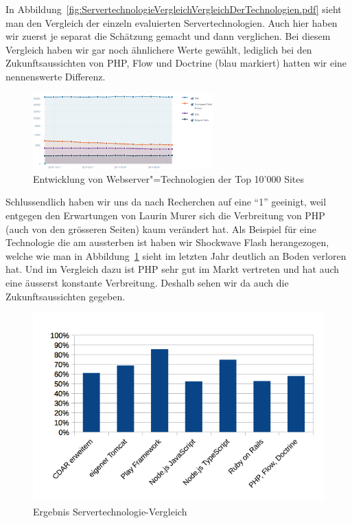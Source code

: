 			In Abbildung~\ref{fig:ServertechnologieVergleichVergleichDerTechnologien.pdf} sieht man den Vergleich der einzeln evaluierten Servertechnologien.
			Auch hier haben wir zuerst je separat die Schätzung gemacht und dann verglichen.
			Bei diesem Vergleich haben wir gar noch ähnlichere Werte gewählt, lediglich bei den Zukunftsaussichten von PHP, Flow und Doctrine (blau markiert) hatten wir eine nennenswerte Differenz.
			\begin{figure}
				\begin{center}
					\includegraphics[width=0.618\textwidth]{media/img/EntwicklungVonWebserverTechnologien.png}
				\end{center}
					\caption{Entwicklung von Webserver"=Technologien der Top 10'000 Sites \cite{sharesOfWebtechnologies}}
					\label{fig:EntwicklungVonWebserverTechnologien}
			\end{figure}
			Schlussendlich haben wir uns da nach Recherchen auf eine "`1"' geeinigt, weil entgegen den Erwartungen von Laurin Murer sich die Verbreitung von PHP (auch von den grösseren Seiten) kaum verändert hat.
			Als Beispiel für eine Technologie die am aussterben ist haben wir Shockwave Flash herangezogen, welche wie man in Abbildung~\ref{fig:EntwicklungVonWebserverTechnologien} sieht im letzten Jahr deutlich an Boden verloren hat.
			Und im Vergleich dazu ist PHP sehr gut im Markt vertreten und hat auch eine äusserst konstante Verbreitung.
			Deshalb sehen wir da auch die Zukunftsaussichten gegeben.
			
			\begin{figure}[H]
				\begin{minipage}[b]{\linewidth}
					\includegraphics[width=\textwidth]{media/spreadsheets/ServertechnologieVergleichVergleichDerTechnologienDiagramm.png}
					\centering
					\caption{Ergebnis Servertechnologie-Vergleich}
					\label{fig:ErgebnisServertechnologieVergleich}
				\end{minipage}
			\end{figure}
			

